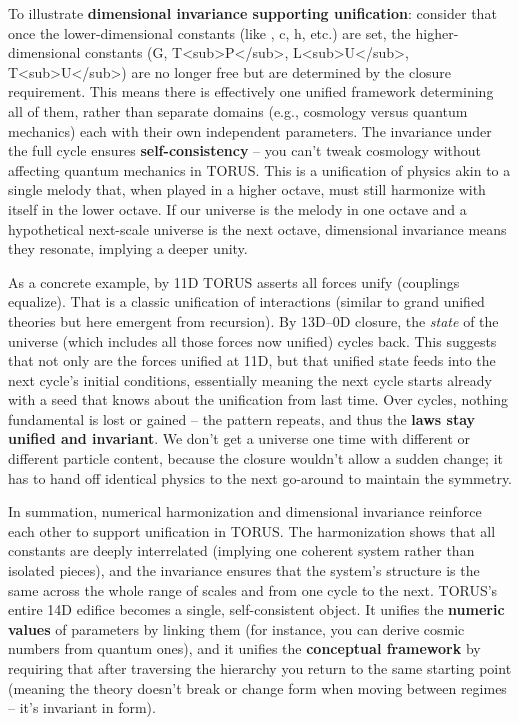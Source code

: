 \documentclass[]{article}
\begin{document}
To illustrate \textbf{dimensional invariance supporting unification}:
consider that once the lower-dimensional constants (like \alpha, c, h, etc.)
are set, the higher-dimensional constants (G,
T\textless{}sub\textgreater{}P\textless{}/sub\textgreater{},
L\textless{}sub\textgreater{}U\textless{}/sub\textgreater{},
T\textless{}sub\textgreater{}U\textless{}/sub\textgreater{}) are no
longer free but are determined by the closure requirement​. This means
there is effectively one unified framework determining all of them,
rather than separate domains (e.g., cosmology versus quantum mechanics)
each with their own independent parameters. The invariance under the
full cycle ensures \textbf{self-consistency} -- you can't tweak
cosmology without affecting quantum mechanics in TORUS. This is a
unification of physics akin to a single melody that, when played in a
higher octave, must still harmonize with itself in the lower octave. If
our universe is the melody in one octave and a hypothetical next-scale
universe is the next octave, dimensional invariance means they resonate,
implying a deeper unity.

As a concrete example, by 11D TORUS asserts all forces unify (couplings
equalize)​. That is a classic unification of interactions (similar to
grand unified theories but here emergent from recursion). By 13D--0D
closure, the \emph{state} of the universe (which includes all those
forces now unified) cycles back. This suggests that not only are the
forces unified at 11D, but that unified state feeds into the next
cycle's initial conditions, essentially meaning the next cycle starts
already with a seed that knows about the unification from last time.
Over cycles, nothing fundamental is lost or gained -- the pattern
repeats, and thus the \textbf{laws stay unified and invariant}. We don't
get a universe one time with different \alpha or different particle content,
because the closure wouldn't allow a sudden change; it has to hand off
identical physics to the next go-around to maintain the symmetry.

In summation, numerical harmonization and dimensional invariance
reinforce each other to support unification in TORUS. The harmonization
shows that all constants are deeply interrelated (implying one coherent
system rather than isolated pieces), and the invariance ensures that the
system's structure is the same across the whole range of scales and from
one cycle to the next. TORUS's entire 14D edifice becomes a single,
self-consistent object. It unifies the \textbf{numeric values} of
parameters by linking them (for instance, you can derive cosmic numbers
from quantum ones), and it unifies the \textbf{conceptual framework} by
requiring that after traversing the hierarchy you return to the same
starting point (meaning the theory doesn't break or change form when
moving between regimes -- it's invariant in form).
\end{document}
